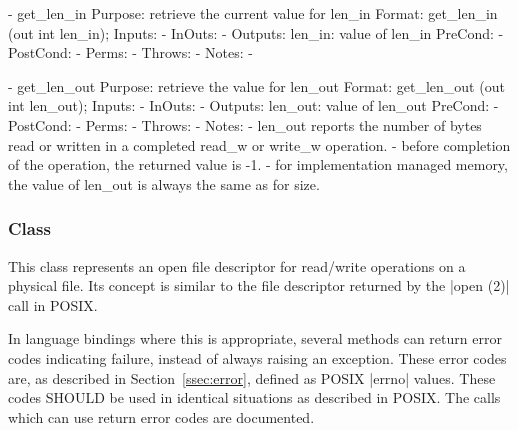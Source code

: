 \begin{myspec}
    - get_len_in
      Purpose:  retrieve the current value for len_in
      Format:   get_len_in           (out int   len_in);
      Inputs:   -
      InOuts:   -
      Outputs:  len_in:               value of len_in
      PreCond:  -
      PostCond: -
      Perms:    - 
      Throws:   -
      Notes:    -
 
    - get_len_out
      Purpose:  retrieve the value for len_out
      Format:   get_len_out          (out int   len_out);
      Inputs:   -
      InOuts:   -
      Outputs:  len_out:              value of len_out
      PreCond:  -
      PostCond: -
      Perms:    - 
      Throws:   -
      Notes:    - len_out reports the number of bytes read
                  or written in a completed read_w or write_w
                  operation.
                - before completion of the operation, the
                  returned value is -1.
                - for implementation managed memory, the 
                  value of len_out is always the same as 
                  for size.
 \end{myspec}
 
 
  \subsubsection*{Class }
 
    This class represents an open file descriptor for read/write
    operations on a physical file.  Its concept is similar to
    the file descriptor returned by the |open (2)| call in
    POSIX.
 
    In language bindings where this is appropriate, several
    methods can return error codes indicating failure, instead
    of always raising an exception.  These error codes are, as
    described in Section~\ref{ssec:error}, defined as POSIX
    |errno| values.  These codes SHOULD be used in identical
    situations as described in POSIX.  The calls which can use
    return error codes are documented.

 
